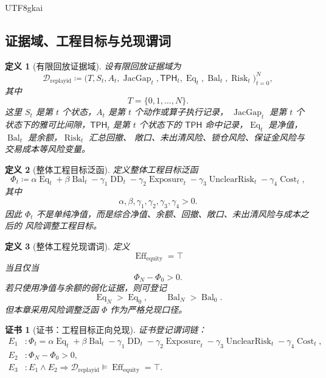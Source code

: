 \documentclass[12pt]{article}
\newtheorem{definition}{定义}[section]
\newtheorem{Certificate}{证书}[section]
\newcommand{\DefEq}{\coloneqq}
\newcommand{\TPH}{\ensuremath{\mathsf{TPH}}}
\DeclareMathOperator{\Eff}{Eff}
\DeclareMathOperator{\JacGap}{JacGap}
\DeclareMathOperator{\Eq}{Eq}
\DeclareMathOperator{\Bal}{Bal}
\DeclareMathOperator{\DD}{DD}
\DeclareMathOperator{\Exposure}{Exposure}
\DeclareMathOperator{\UnclearRisk}{UnclearRisk}
\DeclareMathOperator{\Risk}{Risk}
\DeclareMathOperator{\Cost}{Cost}
\begin{document}
\begin{CJK*}{UTF8}{gkai}
\subsection{证据域、工程目标与兑现谓词}
\label{subsec:tex58-replay-domain-equity}

\begin{definition}[有限回放证据域]
\label{def:tex58-replay-domain}
设有限回放证据域为
\[
  \mathcal D_{\mathrm{replayid}}
  \DefEq
  \bigl(T,S_t,A_t,\JacGap_t,\TPH_t,\Eq_t,\Bal_t,\Risk_t\bigr)_{t=0}^{N},
\]
其中
\[
  T=\{0,1,\ldots,N\}.
\]
这里 \(S_t\) 是第 \(t\) 个状态，\(A_t\) 是第 \(t\) 个动作或算子执行记录，
\(\JacGap_t\) 是第 \(t\) 个状态下的雅可比间隙，\(\TPH_t\) 是第 \(t\) 个状态下的
\TPH{} 命中记录，\(\Eq_t\) 是净值，\(\Bal_t\) 是余额，\(\Risk_t\) 汇总回撤、
敞口、未出清风险、锁仓风险、保证金风险与交易成本等风险变量。
\end{definition}

\begin{definition}[整体工程目标泛函]
\label{def:tex58-engineering-objective}
定义整体工程目标泛函
\[
  \Phi_t
  \DefEq
  \alpha \Eq_t
  +
  \beta \Bal_t
  -
  \gamma_1 \DD_t
  -
  \gamma_2 \Exposure_t
  -
  \gamma_3 \UnclearRisk_t
  -
  \gamma_4 \Cost_t,
\]
其中
\[
  \alpha,\beta,\gamma_1,\gamma_2,\gamma_3,\gamma_4>0.
\]
因此 \(\Phi_t\) 不是单纯净值，而是综合净值、余额、回撤、敞口、未出清风险与成本之后的
风险调整工程目标。
\end{definition}

\begin{definition}[整体工程兑现谓词]
\label{def:tex58-equity-effectiveness}
定义
\[
  \Eff_{\mathrm{equity}}=\top
\]
当且仅当
\[
  \Phi_N-\Phi_0>0.
\]
若只使用净值与余额的弱化证据，则可登记
\[
  \Eq_N>\Eq_0,
  \qquad
  \Bal_N>\Bal_0.
\]
但本章采用风险调整泛函 \(\Phi\) 作为严格兑现口径。
\end{definition}

\begin{Certificate}[证书：工程目标正向兑现]
\label{cert:tex58-equity-effectiveness}
证书登记谓词链：
\[
\begin{aligned}
  E_1 &: \Phi_t
  =
  \alpha \Eq_t+\beta \Bal_t
  -\gamma_1\DD_t-\gamma_2\Exposure_t
  -\gamma_3\UnclearRisk_t-\gamma_4\Cost_t,\\
  E_2 &: \Phi_N-\Phi_0>0,\\
  E_3 &: E_1\wedge E_2
  \Rightarrow
  \mathcal D_{\mathrm{replayid}}\models \Eff_{\mathrm{equity}}=\top.
\end{aligned}
\]
\end{Certificate}


\end{CJK*}
\end{document}
